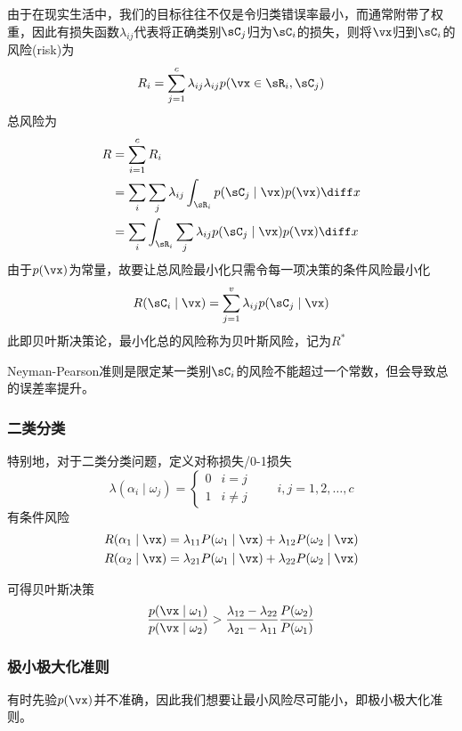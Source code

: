 由于在现实生活中，我们的目标往往不仅是令归类错误率最小，而通常附带了权重，因此有损失函数$\lambda_{ij}$代表将正确类别$\sC_j$归为$\sC_i$的损失，则将$\vx$归到$\sC_i$的风险(risk)为
\[R_i=\sum_{j=1}^c\lambda_{ij}\lambda_{ij}p(\vx\in\sR_i,\sC_j)\]
总风险为
\[\begin{aligned}
R&=\sum_{i=1}^cR_i\\
&=\sum_i\sum_j\lambda_{ij}\int_{\sR_i}p(\sC_j\mid \vx)p(\vx)\diff x\\
&=\sum_i\int_{\sR_i}\sum_j\lambda_{ij}p(\sC_j\mid \vx)p(\vx)\diff x
\end{aligned}\]
由于$p(\vx)$为常量，故要让总风险最小化只需令每一项决策的条件风险最小化
\[R(\sC_i\mid\vx)=\sum_{j=1}^v\lambda_{ij}p(\sC_j\mid\vx)\]
此即贝叶斯决策论，最小化总的风险称为贝叶斯风险，记为$R^*$

Neyman-Pearson准则是限定某一类别$\sC_i$的风险不能超过一个常数，但会导致总的误差率提升。

\subsubsection{二类分类}
特别地，对于二类分类问题，定义对称损失/0-1损失
\[\lambda(\alpha_i\mid\omega_j)=
\begin{cases}
0 & i=j\\
1 & i\ne j
\end{cases}
\qquad i,j=1,2,\ldots,c\]
有条件风险
\[\begin{aligned}
R(\alpha_1\mid\vx)&=\lambda_{11}P(\omega_1\mid\vx)+\lambda_{12}P(\omega_2\mid\vx)\\
R(\alpha_2\mid\vx)&=\lambda_{21}P(\omega_1\mid\vx)+\lambda_{22}P(\omega_2\mid\vx)
\end{aligned}\]

可得贝叶斯决策
\[\frac{p(\vx\mid\omega_1)}{p(\vx\mid\omega_2)}>\frac{\lambda_{12}-\lambda_{22}}{\lambda_{21}-\lambda_{11}}\frac{P(\omega_2)}{P(\omega_1)}\]

\subsubsection{极小极大化准则}
有时先验$p(\vx)$并不准确，因此我们想要让最小风险尽可能小，即极小极大化准则。

